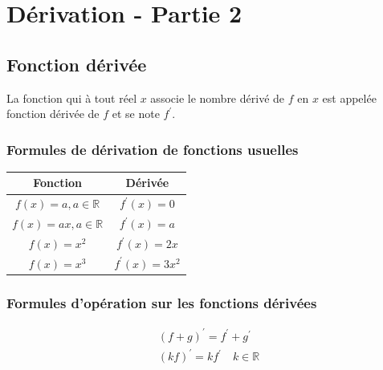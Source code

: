 \chapter{Dérivation - Partie 2}
\thispagestyle{fancy}

\section{Fonction dérivée}
\begin{definition}
	La fonction qui à tout réel $x$ associe le nombre dérivé de $f$ en $x$ est appelée fonction dérivée de $f$ et se note $f^{\prime}$.
\end{definition}
	


\subsection*{Formules de dérivation de fonctions usuelles}

\begin{center}
	\begin{tabular}{|c|c|}
		\hline
		Fonction & Dérivée \\
		\hline
		$f(x)=a, a \in \mathbb{R}$ & $f^{\prime}(x)=0$ \\
		\hline
		$f(x)=a x, a \in \mathbb{R}$ & $f^{\prime}(x)=a$ \\
		\hline
		$f(x)=x^{2}$ & $f^{\prime}(x)=2 x$ \\
		\hline
		$f(x)=x^{3}$ & $f^{\prime}(x)=3 x^{2}$ \\
		\hline
	\end{tabular}
\end{center}

\subsection*{Formules d'opération sur les fonctions dérivées}

$$
\begin{gathered}
	(f+g)^{\prime}=f^{\prime}+g^{\prime} \\
	(k f)^{\prime}=k f^{\prime} \quad k \in \mathbb{R}
\end{gathered}
$$

